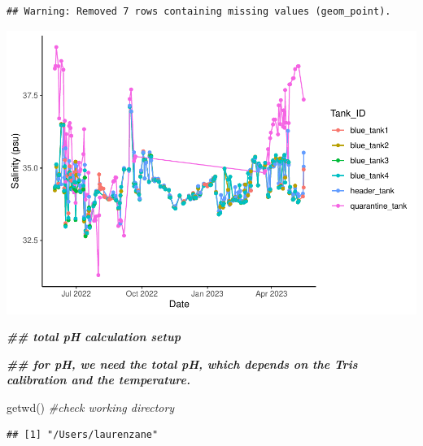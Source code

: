 \documentclass[
]{article}
\newenvironment{Shaded}{\begin{snugshade}}{\end{snugshade}}
\newcommand{\AttributeTok}[1]{\textcolor[rgb]{0.77,0.63,0.00}{#1}}
\newcommand{\CommentTok}[1]{\textcolor[rgb]{0.56,0.35,0.01}{\textit{#1}}}
\newcommand{\DocumentationTok}[1]{\textcolor[rgb]{0.56,0.35,0.01}{\textbf{\textit{#1}}}}
\newcommand{\FunctionTok}[1]{\textcolor[rgb]{0.00,0.00,0.00}{#1}}
\newcommand{\NormalTok}[1]{#1}
\newcommand{\OtherTok}[1]{\textcolor[rgb]{0.56,0.35,0.01}{#1}}
\newcommand{\StringTok}[1]{\textcolor[rgb]{0.31,0.60,0.02}{#1}}
\begin{document}
\begin{verbatim}
## Warning: Removed 7 rows containing missing values (geom_point).
\end{verbatim}

\includegraphics{daily-measurements_files/figure-latex/unnamed-chunk-4-1.pdf}

\begin{Shaded}
\begin{Highlighting}[]
\DocumentationTok{\#\# total pH calculation setup }

\DocumentationTok{\#\# for pH, we need the total pH, which depends on the Tris calibration and the temperature.}

\FunctionTok{getwd}\NormalTok{() }\CommentTok{\#check working directory}
\end{Highlighting}
\end{Shaded}

\begin{verbatim}
## [1] "/Users/laurenzane"
\end{verbatim}

\begin{Shaded}
\end{Shaded}
\end{document}
